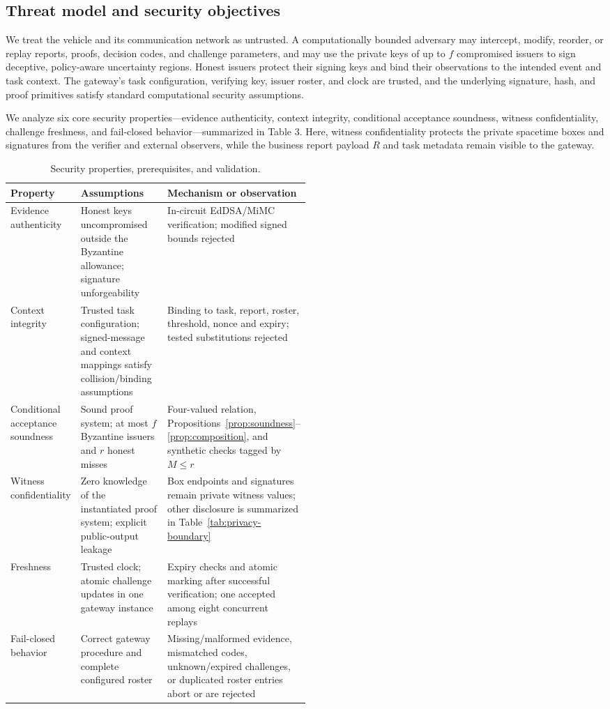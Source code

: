 \documentclass[pdflatex,iicol,sn-mathphys-num]{sn-jnl}
\theoremstyle{thmstyleone}
\begin{document}
\subsection{Threat model and security objectives}
We treat the vehicle and its communication network as untrusted. A computationally bounded adversary may intercept, modify, reorder, or replay reports, proofs, decision codes, and challenge parameters, and may use the private keys of up to $f$ compromised issuers to sign deceptive, policy-aware uncertainty regions. Honest issuers protect their signing keys and bind their observations to the intended event and task context. The gateway's task configuration, verifying key, issuer roster, and clock are trusted, and the underlying signature, hash, and proof primitives satisfy standard computational security assumptions.

We analyze six core security properties---evidence authenticity, context integrity, conditional acceptance soundness, witness confidentiality, challenge freshness, and fail-closed behavior---summarized in Table 3. Here, witness confidentiality protects the private spacetime boxes and signatures from the verifier and external observers, while the business report payload $R$ and task metadata remain visible to the gateway.

\begin{table}[t]\centering\footnotesize
\caption{Security properties, prerequisites, and validation.}\label{tab:security-properties}
\begin{tabularx}{\linewidth}{@{}p{0.20\linewidth}p{0.30\linewidth}X@{}}\toprule
Property & Assumptions & Mechanism or observation\\\midrule
Evidence authenticity & Honest keys uncompromised outside the Byzantine allowance; signature unforgeability & In-circuit EdDSA/MiMC verification; modified signed bounds rejected\\
Context integrity & Trusted task configuration; signed-message and context mappings satisfy collision/binding assumptions & Binding to task, report, roster, threshold, nonce and expiry; tested substitutions rejected\\
Conditional acceptance soundness & Sound proof system; at most $f$ Byzantine issuers and $r$ honest misses & Four-valued relation, Propositions~\ref{prop:soundness}--\ref{prop:composition}, and synthetic checks tagged by $M\le r$\\
Witness confidentiality & Zero knowledge of the instantiated proof system; explicit public-output leakage & Box endpoints and signatures remain private witness values; other disclosure is summarized in Table~\ref{tab:privacy-boundary}\\
Freshness & Trusted clock; atomic challenge updates in one gateway instance & Expiry checks and atomic marking after successful verification; one accepted among eight concurrent replays\\
Fail-closed behavior & Correct gateway procedure and complete configured roster & Missing/malformed evidence, mismatched codes, unknown/expired challenges, or duplicated roster entries abort or are rejected\\\bottomrule
\end{tabularx}\end{table}
\end{document}
